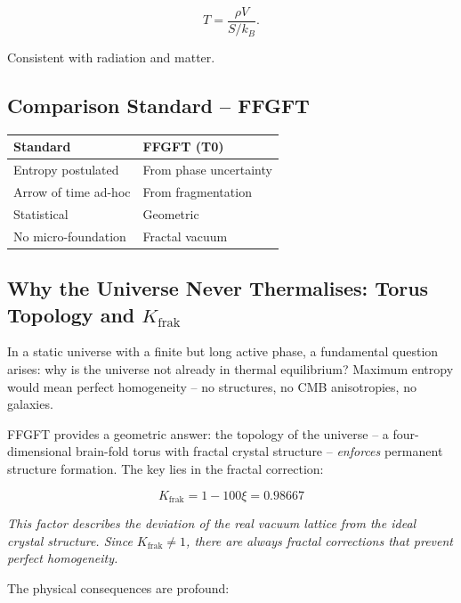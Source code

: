 	\begin{equation}
		T = \frac{\rho V}{S / k_B}.
	\end{equation}
	
	Consistent with radiation and matter.
	
	\subsection*{Comparison Standard – FFGFT}
	
	\begin{center}
		\begin{tabular}{p{}p{}}
			\textbf{Standard} & \textbf{FFGFT (T0)} \\
			\hline
			Entropy postulated & From phase uncertainty \\
			Arrow of time ad-hoc & From fragmentation \\
			Statistical & Geometric \\
			No micro-foundation & Fractal vacuum \\
		\end{tabular}
	\end{center}
	
	\subsection*{Why the Universe Never Thermalises: Torus Topology and $K_{\text{frak}}$}
	
	In a static universe with a finite but long active phase, a fundamental question arises: why is the universe not already in thermal equilibrium? Maximum entropy would mean perfect homogeneity -- no structures, no CMB anisotropies, no galaxies.
	
	FFGFT provides a geometric answer: the topology of the universe -- a four-dimensional brain-fold torus with fractal crystal structure -- \textit{enforces} permanent structure formation. The key lies in the fractal correction:
	
	\begin{equation}
		K_{\text{frak}} = 1 - 100\xi = 0.98667
	\end{equation}
	
	\textit{This factor describes the deviation of the real vacuum lattice from the ideal crystal structure. Since $K_{\text{frak}} \neq 1$, there are \textit{always} fractal corrections that prevent perfect homogeneity.}
	
	The physical consequences are profound:
	
